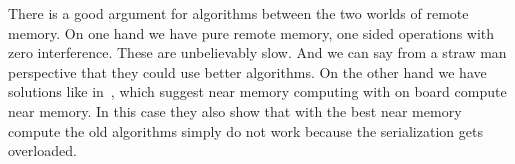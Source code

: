 There is a good argument for algorithms between the two worlds of remote memory.
On one hand we have pure remote memory, one sided operations with zero
interference. These are unbelievably slow. And we can say from a straw man
perspective that they could use better algorithms. On the other hand we have
solutions like in~\cite{design-far-memory-struct,near-memory-structs}, which
suggest near memory computing with on board compute near memory. In this case
they also show that with the best near memory compute the old algorithms simply
do not work because the serialization gets overloaded.



